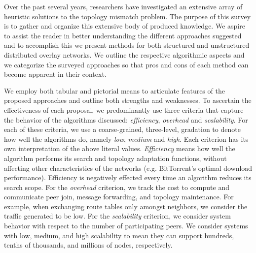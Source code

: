 Over the past several years, researchers have investigated an extensive
array of heuristic solutions to the topology mismatch problem. 
The purpose of this survey is to gather and organize 
this extensive body of produced knowledge. 
We aspire to assist the reader in better understanding the 
different approaches suggested and to accomplish this we 
present methods for both structured and unstructured distributed 
overlay networks.
We outline the respective algorithmic aspects and we categorize
the surveyed approaches so that pros and cons of each method 
can become apparent in their context.

We employ both tabular and pictorial means to 
articulate features of the proposed approaches and outline 
both strengths and weaknesses.
To ascertain the effectiveness of each proposal, we predominantly use 
three criteria that capture the behavior of the algorithms 
discussed:
\emph{efficiency}, \emph{overhead} and \emph{scalability}.
For each of these criteria, we use a coarse-grained,
three-level, gradation to denote how well the algorithms do,
namely \emph{low}, \emph{medium} and \emph{high}.
Each criterion has its own
interpretation of the above literal values. 
\emph{Efficiency} means how well the
algorithm performs its search and topology adaptation functions, without
affecting other characteristics of the networks 
(e.g. BitTorrent's optimal download performance). 
Efficiency is negatively effected every time an algorithm 
reduces its search scope.
For the \emph{overhead} criterion, we track the cost 
to compute and communicate peer join, message forwarding, 
and topology maintenance. 
For example, when exchanging route tables only amongst neighbors, 
we consider the traffic generated to be low.
For the \emph{scalability} criterion, we consider system behavior 
with respect to the number of participating peers. 
We consider systems with low, medium, and high scalability 
to mean they can support hundreds, tenths of thousands, 
and millions of nodes, respectively. 




